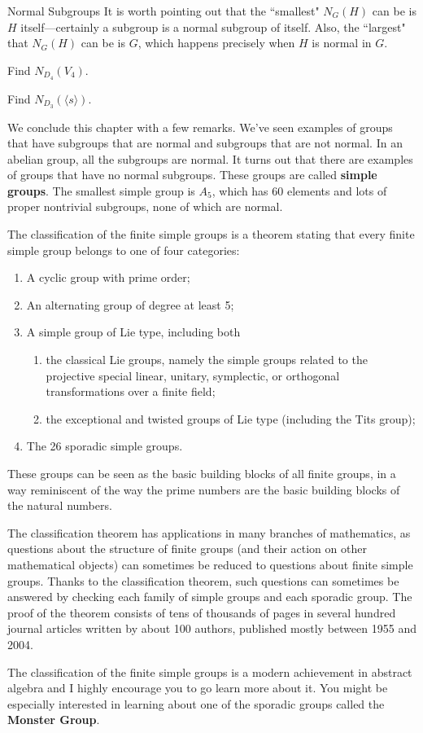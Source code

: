 \begin{section}{Normal Subgroups}
It is worth pointing out that the ``smallest" $N_G(H)$ can be is $H$ itself---certainly a subgroup is a normal subgroup of itself.  Also, the ``largest" that $N_G(H)$ can be is $G$, which happens precisely when $H$ is normal in $G$.

\begin{problem}
Find $N_{D_4}(V_4)$.
\end{problem}

\begin{problem}
Find $N_{D_3}(\langle s\rangle)$.
\end{problem}

We conclude this chapter with a few remarks.  We've seen examples of groups that have subgroups that are normal and subgroups that are not normal.  In an abelian group, all the subgroups are normal.  It turns out that there are examples of groups that have no normal subgroups.  These groups are called \textbf{simple groups}.  The smallest simple group is $A_5$, which has 60 elements and lots of proper nontrivial subgroups, none of which are normal.


The classification of the finite simple groups is a theorem stating that every finite simple group belongs to one of four categories:
\begin{enumerate}
\item A cyclic group with prime order;
\item An alternating group of degree at least 5;
\item A simple group of Lie type, including both 
\begin{enumerate}
\item the classical Lie groups, namely the simple groups related to the projective special linear, unitary, symplectic, or orthogonal transformations over a finite field;
\item the exceptional and twisted groups of Lie type (including the Tits group);
\end{enumerate}
\item The 26 sporadic simple groups.
\end{enumerate}
These groups can be seen as the basic building blocks of all finite groups, in a way reminiscent of the way the prime numbers are the basic building blocks of the natural numbers.

The classification theorem has applications in many branches of mathematics, as questions about the structure of finite groups (and their action on other mathematical objects) can sometimes be reduced to questions about finite simple groups. Thanks to the classification theorem, such questions can sometimes be answered by checking each family of simple groups and each sporadic group.  The proof of the theorem consists of tens of thousands of pages in several hundred journal articles written by about 100 authors, published mostly between 1955 and 2004.

The classification of the finite simple groups is a modern achievement in abstract algebra and I highly encourage you to go learn more about it.  You might be especially interested in learning about one of the sporadic groups called the \textbf{Monster Group}.

\end{section}
